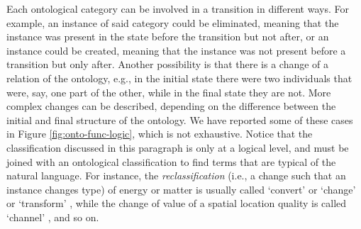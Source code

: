 \documentclass[sw]{iosart2x}
\newcommand{\firstTimeKeyWord}[1]{\textit{#1}}
\newcommand{\quotes}[1]{`#1'}
\begin{document}
Each ontological category can be involved in a transition in different ways. 
For example, an instance of said category could be eliminated, meaning that the instance was present in the state before the transition but not after, or an instance could be created, meaning that the instance was not present before a transition but only after.
Another possibility is that there is a change of a relation of the ontology, e.g., in the initial state there were two individuals that were, say, one part of the other, while in the final state they are not.
More complex changes can be described, depending on the difference between the initial and final structure of the ontology. %
We have reported some of these cases in Figure \ref{fig:onto-func-logic}, which is not exhaustive.
Notice that the classification discussed in this paragraph is only at a logical level, and must be joined with an ontological classification to find terms that are typical of the natural language.
For instance, the \firstTimeKeyWord{reclassification} (i.e., a change such that an instance changes type) of energy or matter is usually called \quotes{convert} \cite{hirtz_functional_2002, sasajimaFBRLFunctionBehavior1995} or \quotes{change} \cite{pahl_engineering_2007} or \quotes{transform} \cite{kitamuraOntologybasedSystematizationFunctional2004}, while the change of value of a spatial location quality is called \quotes{channel} \cite{pahl_engineering_2007,hirtz_functional_2002}, and so on.
\end{document}
